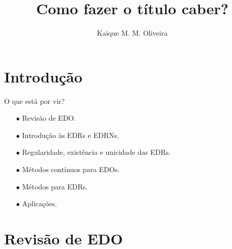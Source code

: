 \documentclass{beamer}
\title{Como fazer o título caber?}
\author[Kaique Oliveira]{Kaique M. M. Oliveira}
\theoremstyle{plain}
\theoremstyle{definition}
\begin{document}
\typesetFrontSlides







\section{Introdução}

\begin{frame}{O que está por vir?}

    \begin{itemize}
        \item[$\bullet$] Revisão de EDO.
        \item[$\bullet$] Introdução às EDRs e EDRNs.
        \item[$\bullet$] Regularidade, existência e unicidade das EDRs.
        \item[$\bullet$] Métodos contínuos para EDOs.
        \item[$\bullet$] Métodos para EDRs.
        \item[$\bullet$] Aplicações.
    \end{itemize}
\end{frame}


\section{Revisão de EDO}
\end{document}
